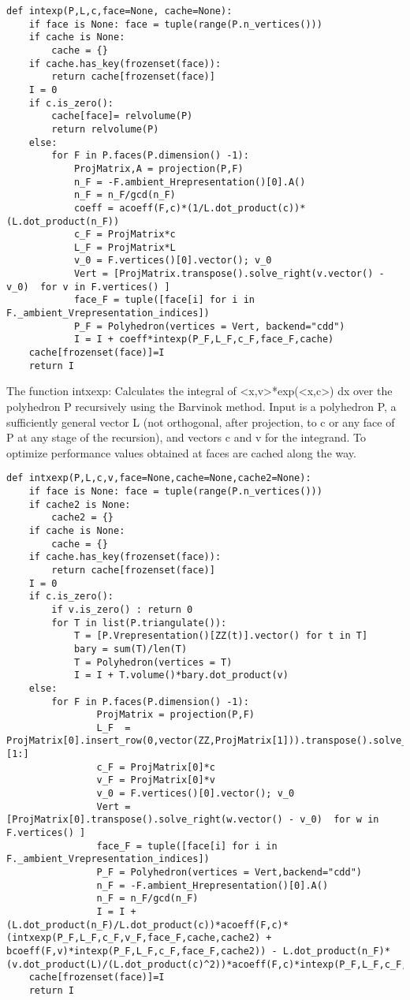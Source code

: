 \begin{lstlisting}
def intexp(P,L,c,face=None, cache=None):
    if face is None: face = tuple(range(P.n_vertices()))
    if cache is None:
        cache = {}
    if cache.has_key(frozenset(face)):
        return cache[frozenset(face)]
    I = 0
    if c.is_zero():
        cache[face]= relvolume(P)
        return relvolume(P)
    else:
        for F in P.faces(P.dimension() -1):
            ProjMatrix,A = projection(P,F)
            n_F = -F.ambient_Hrepresentation()[0].A()
            n_F = n_F/gcd(n_F)
            coeff = acoeff(F,c)*(1/L.dot_product(c))*(L.dot_product(n_F))
            c_F = ProjMatrix*c
            L_F = ProjMatrix*L
            v_0 = F.vertices()[0].vector(); v_0
            Vert = [ProjMatrix.transpose().solve_right(v.vector() - v_0)  for v in F.vertices() ]
            face_F = tuple([face[i] for i in F._ambient_Vrepresentation_indices])
            P_F = Polyhedron(vertices = Vert, backend="cdd")
            I = I + coeff*intexp(P_F,L_F,c_F,face_F,cache)
    cache[frozenset(face)]=I
    return I
\end{lstlisting}

The function intxexp:
Calculates the integral of <x,v>*exp(<x,c>) dx over the polyhedron P recursively using the Barvinok method. Input is a polyhedron P,
a sufficiently general vector L (not orthogonal, after projection, to c or any face of P at any stage of the recursion),
and vectors c and v for the integrand. To optimize performance values obtained at faces are cached along the way.

\begin{lstlisting}
def intxexp(P,L,c,v,face=None,cache=None,cache2=None):
    if face is None: face = tuple(range(P.n_vertices()))
    if cache2 is None:
        cache2 = {}
    if cache is None:
        cache = {}
    if cache.has_key(frozenset(face)):
        return cache[frozenset(face)] 
    I = 0
    if c.is_zero():
        if v.is_zero() : return 0
        for T in list(P.triangulate()):
            T = [P.Vrepresentation()[ZZ(t)].vector() for t in T]
            bary = sum(T)/len(T)
            T = Polyhedron(vertices = T)
            I = I + T.volume()*bary.dot_product(v)
    else:
        for F in P.faces(P.dimension() -1):
                ProjMatrix = projection(P,F)
                L_F  = ProjMatrix[0].insert_row(0,vector(ZZ,ProjMatrix[1])).transpose().solve_right(L)[1:]
                c_F = ProjMatrix[0]*c
                v_F = ProjMatrix[0]*v
                v_0 = F.vertices()[0].vector(); v_0
                Vert = [ProjMatrix[0].transpose().solve_right(w.vector() - v_0)  for w in F.vertices() ]
                face_F = tuple([face[i] for i in F._ambient_Vrepresentation_indices])
                P_F = Polyhedron(vertices = Vert,backend="cdd")
                n_F = -F.ambient_Hrepresentation()[0].A()
                n_F = n_F/gcd(n_F)
                I = I + (L.dot_product(n_F)/L.dot_product(c))*acoeff(F,c)*(intxexp(P_F,L_F,c_F,v_F,face_F,cache,cache2) + bcoeff(F,v)*intexp(P_F,L_F,c_F,face_F,cache2)) - L.dot_product(n_F)*(v.dot_product(L)/(L.dot_product(c)^2))*acoeff(F,c)*intexp(P_F,L_F,c_F,face_F,cache2)
    cache[frozenset(face)]=I
    return I
\end{lstlisting}

